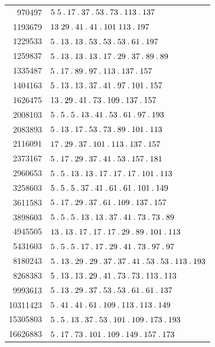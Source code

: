 \begin{longtable}{@{}r|l@{}}
970497 & $5\;5\pdot 17\pdot 37\pdot 53\pdot 73\pdot 113\pdot 137$\\
1193679 & $13\;29\pdot 41\pdot 41\pdot 101\;113\pdot 197$\\
1229533 & $5\pdot 13\pdot 13\pdot 53\pdot 53\pdot 53\pdot 61\pdot 197$\\
1259837 & $5\pdot 13\pdot 13\pdot 13\pdot 17\pdot 29\pdot 37\pdot 89\pdot 89$\\
1335487 & $5\pdot 17\pdot 89\pdot 97\pdot 113\pdot 137\pdot 157$\\
1404163 & $5\pdot 13\pdot 13\pdot 37\pdot 41\pdot 97\pdot 101\pdot 157$\\
1626475 & $13\pdot 29\pdot 41\pdot 73\pdot 109\pdot 137\pdot 157$\\
2008103 & $5\pdot 5\pdot 5\pdot 13\pdot 41\pdot 53\pdot 61\pdot 97\pdot 193$\\
2083893 & $5\pdot 13\pdot 17\pdot 53\pdot 73\pdot 89\pdot 101\pdot 113$\\
2116091 & $17\pdot 29\pdot 37\pdot 101\pdot 113\pdot 137\pdot 157$\\
2373167 & $5\pdot 17\pdot 29\pdot 37\pdot 41\pdot 53\pdot 157\pdot 181$\\
2960653 & $5\pdot 5\pdot 13\pdot 13\pdot 17\pdot 17\pdot 17\pdot 101\pdot 113$\\
3258603 & $5\pdot 5\pdot 5\pdot 37\pdot 41\pdot 61\pdot 61\pdot 101\pdot 149$\\
3611583 & $5\pdot 17\pdot 29\pdot 37\pdot 61\pdot 109\pdot 137\pdot 157$\\
3898603 & $5\pdot 5\pdot 5\pdot 13\pdot 13\pdot 37\pdot 41\pdot 73\pdot 73\pdot 89$\\
4945505 & $13\pdot 13\pdot 17\pdot 17\pdot 17\pdot 29\pdot 89\pdot 101\pdot 113$\\
5431603 & $5\pdot 5\pdot 5\pdot 17\pdot 17\pdot 29\pdot 41\pdot 73\pdot 97\pdot 97$\\
8180243 & $5\pdot 13\pdot 29\pdot 29\pdot 37\pdot 37\pdot 41\pdot 53\pdot 53\pdot 113\pdot 193$\\
8268383 & $5\pdot 13\pdot 13\pdot 29\pdot 41\pdot 73\pdot 73\pdot 113\pdot 113$\\
9993613 & $5\pdot 13\pdot 29\pdot 37\pdot 53\pdot 53\pdot 61\pdot 61\pdot 137$\\
10311423 & $5\pdot 41\pdot 41\pdot 61\pdot 109\pdot 113\pdot 113\pdot 149$\\
15305803 & $5\pdot 5\pdot 13\pdot 37\pdot 53\pdot 101\pdot 109\pdot 173\pdot 193$\\
16626883 & $5\pdot 17\pdot 73\pdot 101\pdot 109\pdot 149\pdot 157\pdot 173$\\

\end{longtable}
